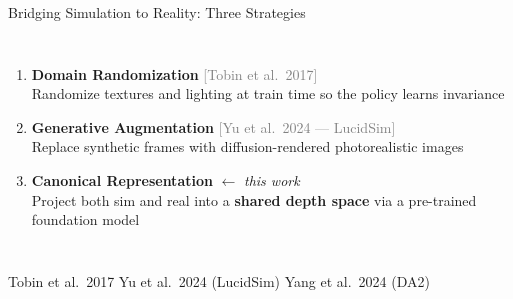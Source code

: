 \documentclass[aspectratio=169,10pt]{beamer}
\newcommand{\source}[1]{\vfill{\tiny\color{gray}#1\par}}
\begin{document}

\begin{frame}{Bridging Simulation to Reality: Three Strategies}
\begin{columns}[T]
  \begin{enumerate}
    \setlength\itemsep{0.9em}
    \item \textbf{Domain Randomization} \textcolor{gray}{\scriptsize[Tobin et al.\ 2017]}\\
          Randomize textures and lighting at train time so the policy learns invariance

    \item \textbf{Generative Augmentation} \textcolor{gray}{\scriptsize[Yu et al.\ 2024
          --- LucidSim]}\\
          Replace synthetic frames with diffusion-rendered photorealistic images

    \item \textbf{Canonical Representation} $\leftarrow$ \emph{this work}\\
          Project both sim and real into a \textbf{shared depth space} via a
          pre-trained foundation model
  \end{enumerate}
\end{columns}
\source{Tobin et al.\ 2017 \textbar{} Yu et al.\ 2024 (LucidSim) \textbar{} Yang et al.\ 2024 (DA2)}
\end{frame}
\end{document}
